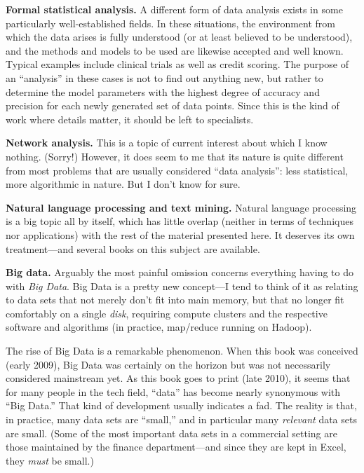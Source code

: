 \textbf{Formal statistical analysis.} A different form of data analysis
exists in some particularly well-established fields. In these
situations, the environment from which the data arises is fully
understood (or at least believed to be understood), and the methods
and models to be used are likewise accepted and well known. Typical
examples include clinical trials as well as credit scoring. The
purpose of an ``analysis'' in these cases is not to find out
anything new, but rather to determine the model parameters with the
highest degree of accuracy and precision for each newly generated
set of data points.  Since this is the kind of work where details
matter, it should be left to specialists.

\textbf{Network analysis.} This is a topic of current interest about
which I know nothing. (Sorry!)  However, it does seem to me that its
nature is quite different from most problems that are usually
considered ``data analysis'': less statistical, more algorithmic in
nature. But I don't know for sure.

\textbf{Natural language processing and text mining.} Natural language
processing is a big topic all by itself, which has little overlap
(neither in terms of techniques nor applications) with the rest of
the material presented here. It deserves its own treatment---and
several books on this subject  are available.

\textbf{Big data.} Arguably the most painful omission concerns
everything having to do with \emph{Big Data}. Big Data is a pretty
new concept---I tend to think of it as relating to data sets that
not merely don't fit into main memory, but that no longer fit
comfortably on a single \emph{disk}, requiring compute clusters and
the respective software and algorithms (in practice, map/reduce
running on Hadoop).

The rise of Big Data is a remarkable phenomenon. When this book was
conceived (early 2009), Big Data was certainly on the horizon but
was not necessarily considered mainstream yet.  As this book goes to
print (late 2010), it seems that for many people in the tech field,
``data'' has become nearly synonymous with ``Big Data.''  That kind
of development usually indicates a fad. The reality is that, in
practice, many data sets are ``small,'' and in particular many
\emph{relevant} data sets are small.  (Some of the most important
data sets in a commercial setting are those maintained by the
finance department---and since they are kept in Excel, they
\emph{must} be small.)

